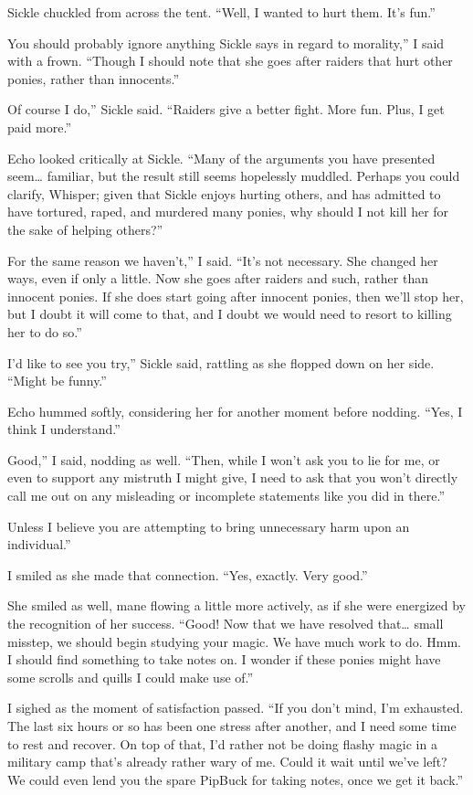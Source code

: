 Sickle chuckled from across the tent. “Well, I wanted to hurt them. It’s fun.”

\leavevmode{}You should probably ignore anything Sickle says in regard to morality,” I said with a frown. “Though I should note that she goes after raiders that hurt other ponies, rather than innocents.”

\leavevmode{}Of course I do,” Sickle said. “Raiders give a better fight. More fun. Plus, I get paid more.”

Echo looked critically at Sickle. “Many of the arguments you have presented seem… familiar, but the result still seems hopelessly muddled. Perhaps you could clarify, Whisper; given that Sickle enjoys hurting others, and has admitted to have tortured, raped, and murdered many ponies, why should I not kill her for the sake of helping others?”

\leavevmode{}For the same reason we haven’t,” I said. “It’s not necessary. She changed her ways, even if only a little. Now she goes after raiders and such, rather than innocent ponies. If she does start going after innocent ponies, then we’ll stop her, but I doubt it will come to that, and I doubt we would need to resort to killing her to do so.”

\leavevmode{}I’d like to see you try,” Sickle said, rattling as she flopped down on her side. “Might be funny.”

Echo hummed softly, considering her for another moment before nodding. “Yes, I think I understand.”

\leavevmode{}Good,” I said, nodding as well. “Then, while I won’t ask you to lie for me, or even to support any mistruth I might give, I need to ask that you won’t directly call me out on any misleading or incomplete statements like you did in there.”

\leavevmode{}Unless I believe you are attempting to bring unnecessary harm upon an individual.”

I smiled as she made that connection. “Yes, exactly. Very good.”

She smiled as well, mane flowing a little more actively, as if she were energized by the recognition of her success. “Good! Now that we have resolved that… small misstep, we should begin studying your magic. We have much work to do. Hmm. I should find something to take notes on. I wonder if these ponies might have some scrolls and quills I could make use of.”

I sighed as the moment of satisfaction passed. “If you don’t mind, I’m exhausted. The last six hours or so has been one stress after another, and I need some time to rest and recover. On top of that, I’d rather not be doing flashy magic in a military camp that’s already rather wary of me. Could it wait until we’ve left? We could even lend you the spare PipBuck for taking notes, once we get it back.”

